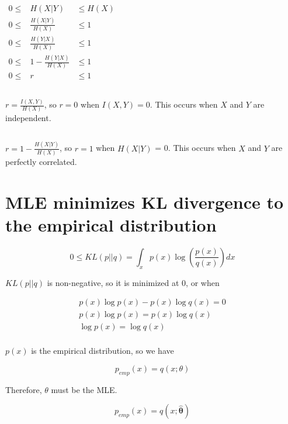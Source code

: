 \documentclass{article}
\begin{document}
\subsection{}
$
\begin{array}{rcl}
  0 \leq 
  & H(X|Y)
  & \leq H(X) \\
  0 \leq
  & \frac{H(X|Y)}{H(X)}
  & \leq 1 \\
  0 \leq 
  & \frac{H(Y|X)}{H(X)}
  & \leq 1 \\
  0 \leq
  & 1 - \frac{H(Y|X)}{H(X)}
  & \leq 1 \\
  0 \leq
  & r
  & \leq 1
\end{array}
$

\subsection{}
$r = \frac{I(X,Y)}{H(X)}$, so $r = 0$ when $I(X,Y) = 0$. This occurs
when $X$ and $Y$ are independent.

\subsection{}
$r = 1 - \frac{H(X|Y)}{H(X)}$, so $r = 1$ when $H(X|Y)$ = 0. This occurs
when $X$ and $Y$ are perfectly correlated.

\section{MLE minimizes KL divergence to the empirical distribution}

\[
0 \le KL(p || q) = \int_x p(x) \log \left( \frac{p(x)}{q(x)} \right)
dx
\]

$KL(p||q)$ is non-negative, so it is minimized at 0, or when

\begin{gather*}
  p(x) \log p(x) - p(x) \log q(x) = 0 \\
  p(x) \log p(x) = p(x) \log q(x) \\
  \log p(x) = \log q(x) \\
\end{gather*}

$p(x)$ is the empirical distribution, so we have

\begin{equation*}
  p_{emp}(x) =  q(x; \theta)
\end{equation*}

Therefore, $\theta$ must be the MLE.

\begin{equation*}
  p_{emp}(x) = q(x; \boldsymbol{\hat{\theta}})
\end{equation*}
\end{document}
